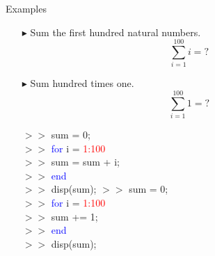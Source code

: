 \documentclass[xcolor={dvipsnames,rgb}, aspectratio=169]{beamer}
\begin{document}
\begin{frame}{Examples}
\begin{itemize}
   \item[$\blacktriangleright$] Sum the first hundred natural numbers.
      \begin{equation*}
         \sum_{i = 1}^{100} i = ?
      \end{equation*}
   \item[$\blacktriangleright$] Sum hundred times one.
      \begin{equation*}
         \sum_{i=1}^{100} 1 = ?
      \end{equation*}
   \begin{tcolorbox}[colback=white,colframe=bluepoli,sidebyside]
      $>>$ sum = 0; \\
      $>>$ \textcolor{blue}{for} i = \textcolor{red}{1:100}\\
      $>>$ \hspace{1em}sum = sum + i;\\
      $>>$ \textcolor{blue}{end}\\
      $>>$ disp(sum);
      \tcblower
      $>>$ sum = 0; \\
      $>>$ \textcolor{blue}{for} i = \textcolor{red}{1:100}\\
      $>>$ \hspace{1em}sum += 1;\\
      $>>$ \textcolor{blue}{end}\\
      $>>$ disp(sum);
    \end{tcolorbox}
\end{itemize}
\end{frame}
\end{document}
